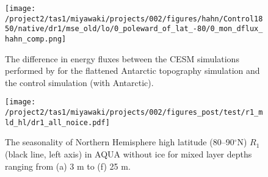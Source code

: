 \documentclass{article}
\begin{document}
\begin{figure}[t]
  \noindent\texttt{[image: /project2/tas1/miyawaki/projects/002/figures/hahn/Control1850/native/dr1/mse\_old/lo/0\_poleward\_of\_lat\_-80/0\_mon\_dflux\_hahn\_comp.png]}
  \caption{The difference in energy fluxes between the CESM simulations performed by \citep{hahn2020} for the flattened Antarctic topography simulation and the control simulation (with Antarctic).}
  \label{fig:hahn-eflux}
\end{figure}

\begin{figure}[t]
  \noindent\texttt{[image: /project2/tas1/miyawaki/projects/002/figures\_post/test/r1\_mld\_hl/dr1\_all\_noice.pdf]}
  \caption{The seasonality of Northern Hemisphere high latitude (80--90$^\circ$N) $R_1$ (black line, left axis) in AQUA without ice for mixed layer depths ranging from (a) 3 m to (f) 25 m.}
  \label{fig:r1-hl-mld-noice}
\end{figure}




\end{document}

